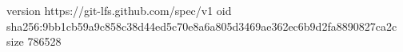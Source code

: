 version https://git-lfs.github.com/spec/v1
oid sha256:9bb1cb59a9c858c38d44ed5c70e8a6a805d3469ae362ec6b9d2fa8890827ca2c
size 786528
